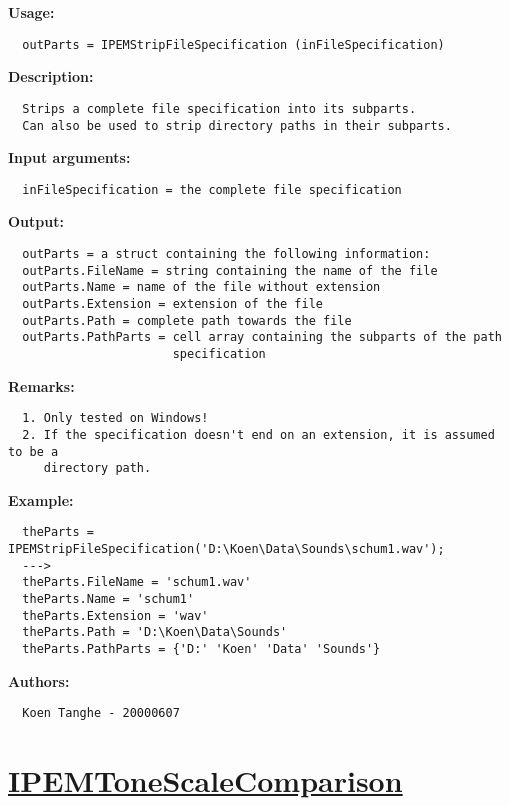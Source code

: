 \textbf{Usage:}
\begin{verbatim}  outParts = IPEMStripFileSpecification (inFileSpecification)

\end{verbatim}
\textbf{Description:}
\begin{verbatim}  Strips a complete file specification into its subparts.
  Can also be used to strip directory paths in their subparts.

\end{verbatim}
\textbf{Input arguments:}
\begin{verbatim}  inFileSpecification = the complete file specification

\end{verbatim}
\textbf{Output:}
\begin{verbatim}  outParts = a struct containing the following information:
  outParts.FileName = string containing the name of the file
  outParts.Name = name of the file without extension
  outParts.Extension = extension of the file
  outParts.Path = complete path towards the file
  outParts.PathParts = cell array containing the subparts of the path
                       specification

\end{verbatim}
\textbf{Remarks:}
\begin{verbatim}  1. Only tested on Windows!
  2. If the specification doesn't end on an extension, it is assumed to be a
     directory path.

\end{verbatim}
\textbf{Example:}
\begin{verbatim}  theParts = IPEMStripFileSpecification('D:\Koen\Data\Sounds\schum1.wav');
  --->
  theParts.FileName = 'schum1.wav'
  theParts.Name = 'schum1'
  theParts.Extension = 'wav'
  theParts.Path = 'D:\Koen\Data\Sounds'
  theParts.PathParts = {'D:' 'Koen' 'Data' 'Sounds'}

\end{verbatim}
\textbf{Authors:}
\begin{verbatim}  Koen Tanghe - 20000607
\end{verbatim}


\newpage
\section*{\hyperlink{Concepts:IPEMToneScaleComparison}{IPEMToneScaleComparison}}
\hypertarget{FuncRef:IPEMToneScaleComparison}{}

